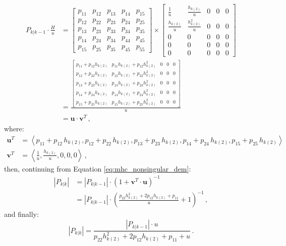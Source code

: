     \begin{align*}
        P_{k|k-1}\cdot \frac{H}{u} &= 
        \begin{bmatrix}
            p_{11} & p_{12} & p_{13} & p_{14} & p_{15} \\
            p_{12} & p_{22} & p_{23} & p_{24} & p_{25} \\
            p_{13} & p_{23} & p_{33} & p_{34} & p_{35} \\
            p_{14} & p_{24} & p_{34} & p_{44} & p_{45} \\
            p_{15} & p_{25} & p_{35} & p_{45} & p_{55}
        \end{bmatrix}
        \times
        \begin{bmatrix}
            \frac{1}{u}        & \frac{h_{k(2)}}{u}   & 0 & 0 & 0 \\
            \frac{h_{k(2)}}{u} & \frac{h_{k(2)}^2}{u} & 0 & 0 & 0 \\
            0                  & 0                    & 0 & 0 & 0 \\
            0                  & 0                    & 0 & 0 & 0 \\
            0                  & 0                    & 0 & 0 & 0
        \end{bmatrix}
        \\
        &=
        \frac{\begin{bmatrix}
            p_{11} + p_{12}h_{k(2)} & p_{11}h_{k(2)} + p_{12}h_{k(2)}^2 & 0 & 0 & 0 \\
            p_{12} + p_{22}h_{k(2)} & p_{12}h_{k(2)} + p_{22}h_{k(2)}^2 & 0 & 0 & 0 \\
            p_{13} + p_{23}h_{k(2)} & p_{13}h_{k(2)} + p_{23}h_{k(2)}^2 & 0 & 0 & 0 \\
            p_{14} + p_{24}h_{k(2)} & p_{14}h_{k(2)} + p_{24}h_{k(2)}^2 & 0 & 0 & 0 \\
            p_{15} + p_{25}h_{k(2)} & p_{15}h_{k(2)} + p_{25}h_{k(2)}^2 & 0 & 0 & 0
        \end{bmatrix}}
        {u}\\
        &= \mathbf{u}\cdot \mathbf{v}^T\,,
    \end{align*}
where:
    \begin{align*}
        \mathbf{u}^T &= \left<p_{11} + p_{12}\,h_{k(2)}, p_{12} + p_{22}\,h_{k(2)}, p_{13} + p_{23}\,h_{k(2)}, p_{14} + p_{24}\,h_{k(2)}, p_{15} + p_{25}\,h_{k(2)} \right>\\
        \mathbf{v}^T &= \left<\frac{1}{u}, \frac{h_{k(2)}}{u}, 0, 0, 0 \right>\,,
    \end{align*}
then, continuing from Equation \eqref{eq:mhc_nonsingular_dem}:
    \begin{align*}
        |P_{k|k}| &= |P_{k|k-1}| \cdot (1 + \mathbf{v}^T \cdot \mathbf{u})^{-1}\\
        &= |P_{k|k-1}| \cdot \left(\frac{p_{22}h_{k(2)}^2 + 2p_{12}h_{k(2)} + p_{11}}{u} + 1\right)^{-1}\,,
    \end{align*}
and finally:
    \begin{equation}
        |P_{k|k}| = \frac{|P_{k|k-1}|\cdot u}{p_{22}h_{k(2)}^2 + 2p_{12}h_{k(2)} + p_{11} + u}\,. \label{eq:mhc_Pkk_definition}
    \end{equation}

